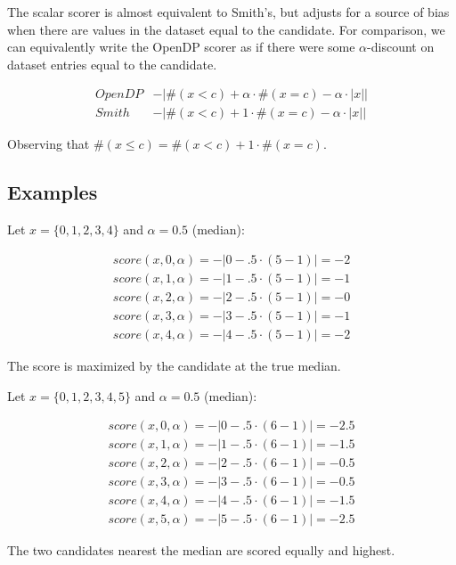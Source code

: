 \documentclass{article}
\begin{document}
The scalar scorer is almost equivalent to Smith's\cite{Smith11}, but adjusts for a source of bias when there are values in the dataset equal to the candidate.
For comparison, we can equivalently write the OpenDP scorer as if there were some $\alpha$-discount on dataset entries equal to the candidate.

\[
\begin{array}{cl}
    OpenDP &-|\#(x < c) + \alpha \cdot \#(x = c) - \alpha \cdot |x|| \\
    Smith &-|\#(x < c) + 1 \cdot \#(x = c) - \alpha \cdot |x||
\end{array}
\]

Observing that $\#(x \leq c) = \#(x < c) + 1 \cdot \#(x = c)$.


\subsection{Examples}

Let $x = \{0,1,2,3,4\}$ and $\alpha = 0.5$ (median):

\begin{align*}
    score(x, 0, \alpha) = -|0 - .5 \cdot (5 - 1)| = -2 \\
    score(x, 1, \alpha) = -|1 - .5 \cdot (5 - 1)| = -1 \\
    score(x, 2, \alpha) = -|2 - .5 \cdot (5 - 1)| = -0 \\
    score(x, 3, \alpha) = -|3 - .5 \cdot (5 - 1)| = -1 \\
    score(x, 4, \alpha) = -|4 - .5 \cdot (5 - 1)| = -2
\end{align*}

The score is maximized by the candidate at the true median.

Let $x = \{0,1,2,3,4,5\}$ and $\alpha = 0.5$ (median):

\begin{align*}
    score(x, 0, \alpha) = -|0 - .5 \cdot (6 - 1)| = -2.5 \\
    score(x, 1, \alpha) = -|1 - .5 \cdot (6 - 1)| = -1.5 \\
    score(x, 2, \alpha) = -|2 - .5 \cdot (6 - 1)| = -0.5 \\
    score(x, 3, \alpha) = -|3 - .5 \cdot (6 - 1)| = -0.5 \\
    score(x, 4, \alpha) = -|4 - .5 \cdot (6 - 1)| = -1.5 \\
    score(x, 5, \alpha) = -|5 - .5 \cdot (6 - 1)| = -2.5
\end{align*}

The two candidates nearest the median are scored equally and highest.
\end{document}
